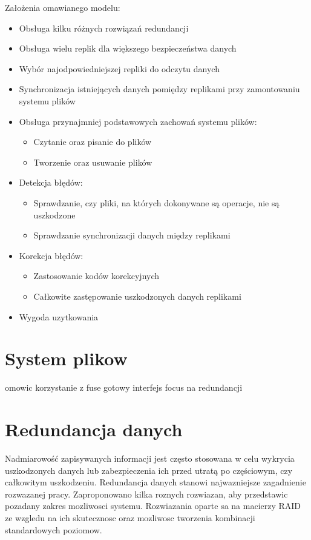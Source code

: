 Założenia omawianego modelu:
\begin{itemize}
    \item Obsługa kilku różnych rozwiązań redundancji
    \item Obsługa wielu replik dla większego bezpieczeństwa danych 
    \item Wybór najodpowiedniejszej repliki do odczytu danych
    \item Synchronizacja istniejących danych pomiędzy replikami przy zamontowaniu systemu plików
	\item Obsługa przynajmniej podstawowych zachowań systemu plików:
		\begin{itemize}
			\item Czytanie oraz pisanie do plików
			\item Tworzenie oraz usuwanie plików
		\end{itemize}
	\item Detekcja błędów:
		\begin{itemize}
			\item Sprawdzanie, czy pliki, na których dokonywane są operacje, nie są uszkodzone
			\item Sprawdzanie synchronizacji danych między replikami
		\end{itemize}
	\item Korekcja błędów:
		\begin{itemize}
			\item Zastosowanie kodów korekcyjnych
			\item Całkowite zastępowanie uszkodzonych danych replikami
		\end{itemize}
    \item Wygoda uzytkowania
\end{itemize}

\section{System plikow}
omowic korzystanie z fuse gotowy interfejs focus na redundancji

\section {Redundancja danych}
Nadmiarowość zapisywanych informacji jest często stosowana w celu wykrycia uszkodzonych danych lub zabezpieczenia ich przed utratą po częściowym, czy całkowitym uszkodzeniu.
Redundancja danych stanowi najwazniejsze zagadnienie rozwazanej pracy. Zaproponowano kilka roznych rozwiazan, aby przedstawic pozadany zakres mozliwosci systemu. Rozwiazania oparte sa na macierzy RAID ze wzgledu na ich skutecznosc oraz mozliwosc tworzenia kombinacji standardowych poziomow.

